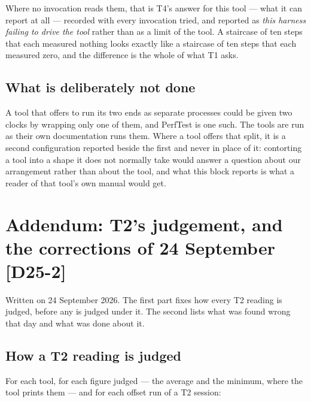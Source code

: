 \documentclass[11pt]{article}
\newcommand{\chg}[1]{\,{\color{chgcol}\bfseries\footnotesize[#1]}}
\begin{document}
Where no invocation reads them, that is T4's answer for this tool --- what it can report at all
--- recorded with every invocation tried, and reported as \emph{this harness failing to drive the
tool} rather than as a limit of the tool. A staircase of ten steps that each measured nothing
looks exactly like a staircase of ten steps that each measured zero, and the difference is the
whole of what T1 asks.

\subsection*{What is deliberately not done}
A tool that offers to run its two ends as separate processes could be given two clocks by wrapping
only one of them, and PerfTest is one such. The tools are run as their own documentation runs
them. Where a tool offers that split, it is a second configuration reported beside the first and
never in place of it: contorting a tool into a shape it does not normally take would answer a
question about our arrangement rather than about the tool, and what this block reports is what a
reader of that tool's own manual would get.

\section[Addendum: T2's judgement, and the corrections of 24 September]{Addendum: T2's judgement, and the corrections of 24 September\protect\chg{D25-2}}\label{sec:addendum-t2}
Written on 24 September 2026. The first part fixes how every T2 reading is judged, before any is
judged under it. The second lists what was found wrong that day and what was done about it.

\subsection*{How a T2 reading is judged}
For each tool, for each figure judged --- the average and the minimum, where the tool prints
them --- and for each offset run of a T2 session:
\end{document}
